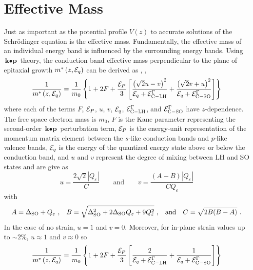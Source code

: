 \documentclass[12pt]{report}
\begin{document}
\section{Effective Mass}

Just as important as the potential profile $V(z)$ to accurate solutions of the Schr\"{o}dinger equation is the effective mass.  Fundamentally, the effective mass of an individual energy band is influenced by the surrounding energy bands. Using $\textbf{k}\bullet \textbf{p}$ theory, the conduction band effective mass perpendicular to the plane of epitaxial growth $m^*\left(z,\EE_q\right)$ can be derived as \cite{Vurgaftman}, \cite{Sugawara:PRB:1993}, \cite{Sirtori:PRB:1994}
\begin{equation}
\label{chpt1eqn:effective_mass}
\frac{1}{m^*\left(z,\EE_q\right)} = \frac{1}{m_0} \left\{1+2F+\frac{\EE_P}{3} \left[ \frac{ \left(\sqrt{2} u-v\right)^2}{\EE_q + \EE_{\tn{C}-\tn{LH}}^\Gamma} + \frac{ \left(\sqrt{2} v+u \right)^2}{\EE_q + \EE_{\tn{C}-\tn{SO}}^\Gamma} \right] \right\}
\end{equation}
where each of the terms $F$, $\EE_P$, $u$, $v$, $\EE_q$, $\EE_{\tn{C}-\tn{LH}}^\Gamma$, and $\EE_{\tn{C}-\tn{SO}}^\Gamma$ have $z$-dependence.  The free space electron mass is $m_0$, $F$ is the Kane parameter representing the second-order $\textbf{k}\bullet \textbf{p}$ perturbation term, $\EE_P$ is the energy-unit representation of the momentum matrix element between the $s$-like conduction bands and $p$-like valence bands, $\EE_q$ is the energy of the quantized energy state above or below the conduction band, and $u$ and $v$ represent the degree of mixing between LH and SO states and are give as
\begin{equation}
u = \frac{2\sqrt{2} |Q_\varepsilon|}{C} \qquad \text{and} \qquad
v = \frac{(A-B) |Q_\varepsilon|}{C Q_\varepsilon}
\end{equation}
with
\begin{equation}
A=\Delta_{\textnormal{SO}}+Q_\varepsilon \text{ ,} \quad
B=\sqrt{\Delta_{\textnormal{SO}}^2+2 \Delta_{\textnormal{SO}} Q_\varepsilon +9 Q_\varepsilon^2}\text{ ,}\quad \text{and} \quad
C=\sqrt{2 B (B-A)} \text{~.}
\end{equation}
In the case of no strain, $u=1$ and $v=0$.  Moreover, for in-plane strain values up to $\sim\!2$\%, $u\approx1$ and $v\approx0$ so
\begin{equation}
\label{chpt1eqn:effective_mass_simple}
\frac{1}{m^*\left(z,\EE_q\right)} = \frac{1}{m_0} \left\{ 1+2F+ \frac{\EE_P}{3} \left[ \frac{2}{\EE_q + \EE_{\tn{C}-\tn{LH}}^\Gamma} + \frac{1}{\EE_q + \EE_{\tn{C}-\tn{SO}}^\Gamma} \right] \right\}
\end{equation}
\end{document}
